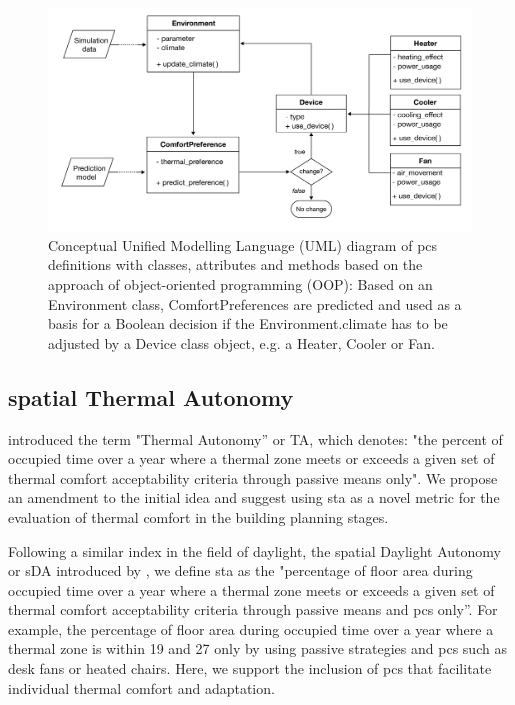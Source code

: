 \begin{figure}[H]
    \centering
    \includegraphics[width=\linewidth]{manuscript/src/figures/pcs-oop-flowchart.png}
    \caption{Conceptual Unified Modelling Language (UML) diagram of \gls{pcs} definitions with classes, attributes and methods based on the approach of object-oriented programming (OOP): Based on an Environment class, ComfortPreferences are predicted and used as a basis for a Boolean decision if the Environment.climate has to be adjusted by a Device class object, e.g. a Heater, Cooler or Fan.}
    \label{fig:pcs-oop}
\end{figure}




\subsection{spatial Thermal Autonomy}

\citet{Levitt2013} introduced the term "Thermal Autonomy” or TA, which denotes: "the percent of occupied time over a year where a thermal zone meets or exceeds a given set of thermal comfort acceptability criteria through passive means only". We propose an amendment to the initial idea and suggest using \gls{sta} as a novel metric for the evaluation of thermal comfort in the building planning stages.

Following a similar index in the field of daylight, the spatial Daylight Autonomy or sDA introduced by \citet{Heschong2012}, we define \gls{sta} as the "percentage of floor area during occupied time over a year where a thermal zone meets or exceeds a given set of thermal comfort acceptability criteria through passive means and \gls{pcs} only”. For example, the percentage of floor area during occupied time over a year where a thermal zone is within 19 and 27 only by using passive strategies and \gls{pcs} such as desk fans or heated chairs. Here, we support the inclusion of \gls{pcs} that facilitate individual thermal comfort and adaptation.

